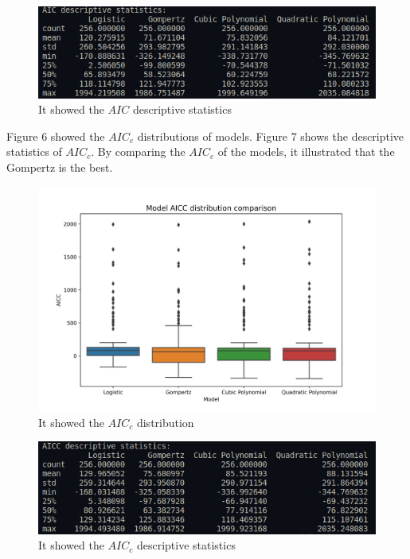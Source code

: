 \documentclass[11pt]{article}
\begin{document}
    \begin{figure}[H]
      \centering
      \includegraphics[width=\textwidth]{../sandbox/AIC descriptive statistics.png}
      \caption{It showed the $AIC$ descriptive statistics}
    \end{figure}

    Figure 6 showed the $AIC_c$ distributions of models. Figure 7 shows the descriptive statistics of $AIC_c$. 
    By comparing the $AIC_c$ of the models, it illustrated that the Gompertz is the best.

    \begin{figure}[H]
      \centering
      \includegraphics[width=\textwidth]{../results/Model_AICC_distribution.png}
      \caption{It showed the $AIC_c$ distribution}
    \end{figure}

    \begin{figure}[H]
      \centering
      \includegraphics[width=\textwidth]{../sandbox/AICC descriptive statistics.png}
      \caption{It showed the $AIC_c$ descriptive statistics}
    \end{figure}
\end{document}
